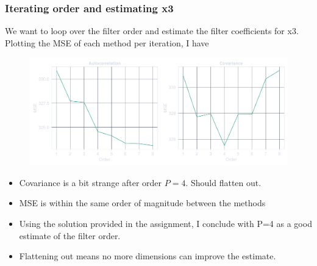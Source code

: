 \documentclass[compress,aspectratio=169]{beamer}
\begin{document}
\begin{frame} %
    \frametitle{Iterating order and estimating x3}
    We want to loop over the filter order and estimate the filter coefficients for
    x3.
    Plotting the MSE of each method per iteration, I have
    \begin{figure}
        \includegraphics[width=0.6\columnwidth]{"../4.pdf"}
    \end{figure}
    \begin{itemize}
        \item Covariance is a bit strange after order $P=4$. Should flatten out.
        \item MSE is within the same order of magnitude between the methods
        \item Using the solution provided in the assignment, I conclude with P=4
            as a good estimate of the filter order.
        \item Flattening out means no more dimensions can improve the estimate.
    \end{itemize}
\end{frame}
\end{document}
